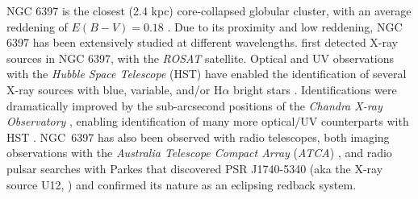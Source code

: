 \documentclass[fleqn,usenatbib,useAMS,letters]{mnras}
\begin{document}
NGC 6397 is the closest (2.4 kpc) core-collapsed globular cluster,  %
  with an average reddening of $E(B - V) = 0.18$ \citep{harris_catalog_1996,mclaughlin_resolved_2005}. Due to its proximity and low reddening, NGC 6397 has been extensively studied at different wavelengths. %
  \cite{cool_discovery_1993} first detected X-ray sources in NGC 6397, with the {\it ROSAT} satellite. %
  Optical and UV observations with the {\it Hubble Space Telescope} (HST) have enabled the identification of several X-ray sources with blue, variable, and/or H$\alpha$ bright stars \citep{cool_discovery_1995,grindlay_spectroscopic_1995,Cool98,taylor_helium_2001,Ferraro01,Shara05}. Identifications were dramatically improved by the  sub-arcsecond positions of the {\it Chandra X-ray Observatory} \citep{grindlay_chandra_2001,bogdanov_chandra_2010}, enabling identification of many more optical/UV counterparts with HST \citep{kaluzny_photometric_2006,cohn_identification_2010,Heinke14,Pallanca2017Halpha,Dieball2017UV}.
NGC~6397 has also been observed with radio telescopes, both imaging observations with the {\it Australia Telescope Compact Array} ({\it ATCA}) \citep{CoryPaper}, and %
radio pulsar searches 
with Parkes \citep{damico2001discovery} that 
discovered PSR J1740-5340  (aka the X-ray source U12, \citealt{grindlay_chandra_2001}) and confirmed its nature as an eclipsing redback system. 
\end{document}
